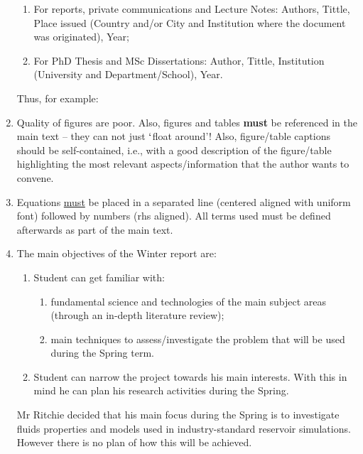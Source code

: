 \documentclass[14pt,twoside]{report}
\begin{document}
\begin{enumerate}
\begin{enumerate}
\item For reports,  private communications and Lecture Notes: Authors, Tittle, Place issued (Country and/or City and Institution where the document was originated), Year;
\item For PhD Thesis and MSc Dissertations: Author, Tittle, Institution (University and Department/School), Year.
\end{enumerate}  
Thus, for example:
%
\item Quality of figures are poor. Also, figures and tables {\bf must} be referenced in the main text -- they can not just $\lq$float around'! Also, figure/table captions should be self-contained, i.e., with a good description of the figure/table highlighting the most relevant aspects/information that the author wants to convene. 
%
\item Equations \underline{must} be placed in a separated line (centered aligned with uniform font) followed by numbers (rhs aligned). All terms used must be defined afterwards as part of the main text.
% 
\item The main objectives of the Winter report are:
\begin{enumerate} 
\item Student can get familiar with:    
\begin{enumerate}
\item fundamental science and technologies of the main subject areas (through an in-depth literature review);
\item main techniques to assess/investigate the problem that will be used during the Spring term.
\end{enumerate}
\item Student can narrow the project towards his main interests. With this in mind he can plan his research activities during the Spring.
\end{enumerate}
Mr Ritchie decided that his main focus during the Spring is to investigate fluids properties and models used in industry-standard reservoir simulations. However there is no plan of how this will be achieved.
% 
\end{enumerate}
\end{document}
